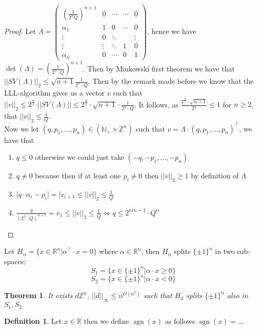 \documentclass[a4paper,11pt,american]{article}
\newcommand{\N}{\mathbb{N}}
\newcommand{\R}{\mathbb{R}}
\newcommand{\Z}{\mathbb{Z}}
\newcommand{\norm}[1]{\vert\vert#1\vert\vert}
\DeclareMathOperator{\sign}{sgn}
\theoremstyle{plain}
\newtheorem{theorem}{Theorem}
\theoremstyle{definition}
\newtheorem{definition}{Definition}
\begin{document}
\begin{proof}
    Let $\Lambda=\begin{pmatrix}
    (\frac{1}{2^nQ})^{n+1} & 0 & \cdots & \cdots & 0 \\
    \alpha_1 & 1 & 0 & \cdots & 0 \\
    \vdots & 0 & \ddots & &  \vdots \\
     \vdots &\vdots & \ddots& 1 & 0 \\
    \alpha_n & 0 & \cdots & 0 & 1
\end{pmatrix}$, hence we have $\det(\Lambda)=(\frac{1}{2^n\cdot Q})^{n+1}$. Then by Minkowski first theorem we have that $\norm{SV(\Lambda)}_2\leq\sqrt{n+1}\frac{1}{2^n\cdot Q}$. Then by the remark made before we know that the LLL-algorithm gives us a vector $v$ such that $\norm{v}_2\leq2^{\frac{n}{2}}\cdot\norm{SV(\Lambda)}\leq 2^{\frac{n}{2}}\cdot\sqrt{n+1}\cdot\frac{1}{2^n\cdot Q}$. It follows, as $\frac{2^{\frac{n}{2}}\cdot\sqrt{n+1}}{2^n}\leq 1$ for $n\geq 2$, that $\norm{v}_2\leq \frac{1}{Q}$.\\
Now we let $(q,p_1,\dots,p_n)\in (\N_+\times\Z^n)$ such that $v=\Lambda\cdot (q,p_1,\dots,p_n)^\top$, we have that\begin{enumerate}
    \item $q\leq 0$ otherwise we could just take $(-q,-p_1,\dots,-p_n)$
    \item $q\neq 0$ because then if at least one $p_i\neq 0$ then $\norm{v}_2\geq 1$ by definition of $\Lambda$
    \item $\vert q\cdot\alpha_i-p_i\vert =\vert v_{i+1}\leq\norm{v}_2\leq\frac{1}{Q}$
    \item $\frac{q}{(2^n\cdot Q)^{n+1}}=v_1\leq\norm{v}_2\leq\frac{1}{Q}\iff q\leq 2^{n(n+1}\cdot Q^n$
\end{enumerate}
\end{proof}
Let $H_{\alpha}=\{x\in\R^n\vert \alpha^\top\cdot x=0\}$ where $\alpha\in\R^n$, then $H_{\alpha}$ splits $\{\pm1\}^n$ in two sub-spaces:
$$S_1=\{x\in\{\pm1\}^n\vert\alpha\cdot x\geq 0\}$$
$$S_2=\{x\in\{\pm1\}^n\vert\alpha\cdot x< 0\}$$
\begin{theorem}
    It exists $d\Z^n$, $\norm{d}_{\infty}\leq n^{O(n^2)}$ such that $H_d$ splits $\{\pm 1\}^n$ also in $S_1,S_2$
\end{theorem}
\begin{definition}
    Let $x\in \R$ then we define $\sign(x)$ as follows $\sign (x)=...$
\end{definition}
\end{document}

